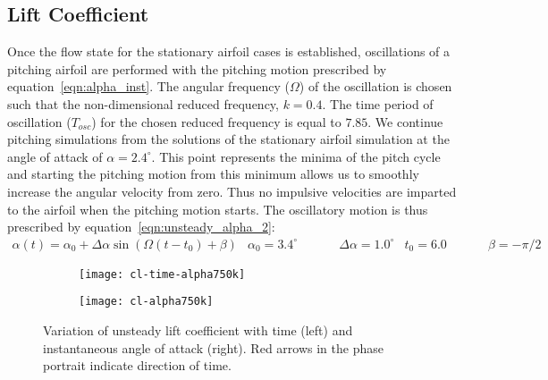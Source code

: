 \subsection{Lift Coefficient}
Once the flow state for the stationary airfoil cases is established, oscillations of a pitching airfoil are performed with the pitching motion prescribed by equation~\ref{eqn:alpha_inst}. The angular frequency ($\Omega$) of the oscillation is chosen such that the non-dimensional reduced frequency, $k=0.4$. The time period of oscillation ($T_{osc}$) for the chosen reduced frequency is equal to $7.85$. We continue pitching simulations from the solutions of the stationary airfoil simulation at the angle of attack of $\alpha=2.4^{\circ}$. This point represents the minima of the pitch cycle and starting the pitching motion from this minimum allows us to smoothly increase the angular velocity from zero. Thus no impulsive velocities are imparted to the airfoil when the pitching motion starts. The oscillatory motion is thus prescribed by equation~\ref{eqn:unsteady_alpha_2}:
\begin{subequations}
	\begin{align}
		\alpha(t) = \alpha_{0} + \Delta\alpha\sin(\Omega (t-t_{0}) + \beta) %
	\end{align}
	\begin{align}
		\alpha_{0}=3.4^{\circ} \hspace{30pt} & \Delta\alpha=1.0^{\circ} & t_{0}=6.0 \hspace{30pt}& \beta=-\pi/2
	\end{align}
\label{eqn:unsteady_alpha_2}
\end{subequations}
\begin{figure}[h]
	\centering
	\begin{subfigure}[t]{0.48\textwidth}
		\texttt{[image: cl-time-alpha750k]}
		\caption{}
		\label{fig:750k_cl_time_alpha}		
	\end{subfigure}
	\begin{subfigure}[t]{0.495\textwidth}
		\texttt{[image: cl-alpha750k]}
		\caption{}
		\label{fig:750k_cl_alpha}			
	\end{subfigure}	
	\caption{Variation of unsteady lift coefficient with time (left) and instantaneous angle of attack (right). Red arrows in the phase portrait indicate direction of time.}
	\label{fig:750k_unsteady_lift}
\end{figure}
